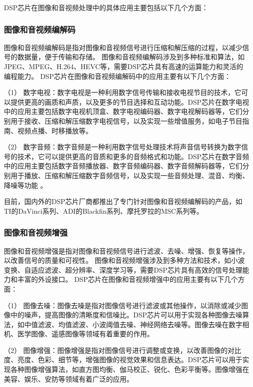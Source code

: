 \documentclass{math201}
\begin{document}
DSP芯片在图像和音视频处理中的具体应用主要包括以下几个方面：

\subsubsection{图像和音视频编解码}

图像和音视频编解码是指对图像和音视频信号进行压缩和解压缩的过程，以减少信号的数据量，便于传输和存储。
图像和音视频编解码涉及到多种标准和算法，如JPEG、MPEG、H.264、HEVC等，需要DSP芯片具有高速的运算能力和灵活的编程能力。
DSP芯片在图像和音视频编解码中的应用主要有以下几个方面：

（1） 数字电视：数字电视是一种利用数字信号传输和接收电视节目的技术，它可以提供更高的画质和声质，以及更多的节目选择和互动功能。DSP芯片在数字电视中的应用主要包括数字电视机顶盒、数字电视编码器、数字电视解码器等，它们分别用于接收、压缩和解压缩数字电视信号，以及实现一些增值服务，如电子节目指南、视频点播、时移播放等。

（2） 数字音频：数字音频是一种利用数字信号处理技术将声音信号转换为数字信号的技术，它可以提供更高的音质和更多的音频格式和功能。DSP芯片在数字音频中的应用主要包括数字音频播放器、数字音频编码器、数字音频解码器等，它们分别用于播放、压缩和解压缩数字音频信号，以及实现一些音频处理、混音、均衡、降噪等功能 。

目前，国内外的DSP芯片厂商都推出了专门针对图像和音视频编解码的产品，如TI的DaVinci系列、ADI的Blackfin系列、摩托罗拉的MSC系列等。

\subsubsection{图像和音视频增强}

图像和音视频增强是指对图像和音视频信号进行滤波、去噪、增强、恢复等操作，以改善信号的质量和可视性。
图像和音视频增强涉及到多种方法和技术，如小波变换、自适应滤波、超分辨率、深度学习等，需要DSP芯片具有高效的信号处理能力和丰富的外设接口。
DSP芯片在图像和音视频增强中的应用主要有以下几个方面：

（1） 图像去噪：图像去噪是指对图像信号进行滤波或其他操作，以消除或减少图像中的噪声，提高图像的清晰度和信噪比。DSP芯片可以用于实现各种图像去噪算法，如中值滤波、均值滤波、小波阈值去噪、神经网络去噪等。图像去噪在数字相机、医学图像、遥感图像等领域有着重要的作用。

（2） 图像增强：图像增强是指对图像信号进行调整或变换，以改善图像的对比度、亮度、色彩、细节等，增强图像的视觉效果和信息表达。DSP芯片可以用于实现各种图像增强算法，如直方图均衡、伽马校正、锐化、色彩平衡等。图像增强在美容、娱乐、安防等领域有着广泛的应用。
\end{document}
